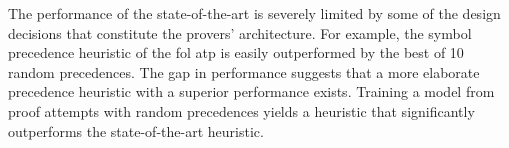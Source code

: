 
The performance of the state-of-the-art  is severely limited by some of the design decisions that constitute the provers' architecture.
For example, the \frequency{} symbol precedence heuristic of the \acrfull{fol} \acrshort{atp} \Vampire{} is easily outperformed by the best of 10 random precedences.\cite{}
The gap in performance suggests that a more elaborate precedence heuristic with a superior performance exists.
Training a model from proof attempts with random precedences yields a heuristic that significantly outperforms the state-of-the-art heuristic.

\fi
